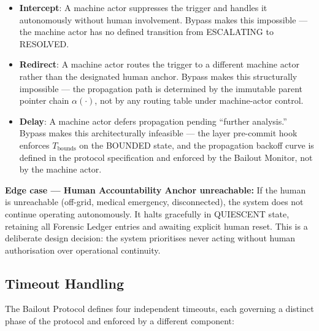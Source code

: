 \begin{itemize}\itemsep=0pt
\item \textbf{Intercept}: A machine actor suppresses the trigger and handles
  it autonomously without human involvement. Bypass makes this impossible
  — the machine actor has no defined transition from ESCALATING to
  RESOLVED.

\item \textbf{Redirect}: A machine actor routes the trigger to a different
  machine actor rather than the designated human anchor. Bypass makes
  this structurally impossible — the propagation path is determined by the
  immutable parent pointer chain $\alpha(\cdot)$, not by any routing table
  under machine-actor control.

\item \textbf{Delay}: A machine actor defers propagation pending ``further
  analysis.'' Bypass makes this architecturally infeasible — the \fact{}
  layer pre-commit hook enforces $T_{\text{bounds}}$ on the BOUNDED state,
  and the propagation backoff curve is defined in the protocol specification
  and enforced by the Bailout Monitor, not by the machine actor.
\end{itemize}

\bigskip
\noindent\textbf{Edge case — Human Accountability Anchor unreachable:} If
the human is unreachable (off-grid, medical emergency, disconnected), the
system does not continue operating autonomously. It halts gracefully in
QUIESCENT state, retaining all Forensic Ledger entries and awaiting
explicit human reset. This is a deliberate design decision: the system
prioritises never acting without human authorisation over operational
continuity.


\subsection{Timeout Handling}\label{sec:bailout-timeouts}

The Bailout Protocol defines four independent timeouts, each governing a
distinct phase of the protocol and enforced by a different component:

